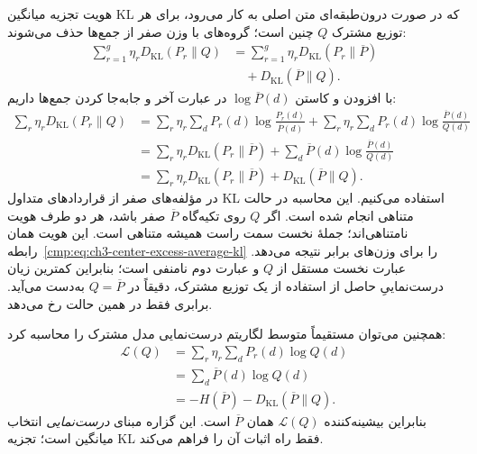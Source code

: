 هویت تجزیه میانگین KL که در صورت درون‌طبقه‌ای متن اصلی به کار می‌رود، برای هر توزیع مشترک $Q$ چنین است؛ گروه‌های با وزن صفر از جمع‌ها حذف می‌شوند:
\begin{equation}\label{eq:app-ch3-mixture-KL-general}
\boxed{
\begin{aligned}
\sum_{r=1}^{g}\eta_rD_{\mathrm{KL}}(P_r\|Q)
&=\sum_{r=1}^{g}\eta_rD_{\mathrm{KL}}(P_r\|\overline P)\\
&\quad+D_{\mathrm{KL}}(\overline P\|Q).
\end{aligned}}
\end{equation}
 با افزودن و کاستن $\log\overline P(d)$ در عبارت آخر و جابه‌جا کردن جمع‌ها داریم:
\begin{equation}\label{eq:app-ch3-mixture-KL-decomposition-proof}
\begin{aligned}
\sum_r\eta_rD_{\mathrm{KL}}(P_r\|Q)
&=\sum_r\eta_r\sum_dP_r(d)
\log\frac{P_r(d)}{\overline P(d)}
+\sum_r\eta_r\sum_dP_r(d)
\log\frac{\overline P(d)}{Q(d)}\\
&=\sum_r\eta_rD_{\mathrm{KL}}(P_r\|\overline P)
+\sum_d\overline P(d)\log\frac{\overline P(d)}{Q(d)}\\
&=\sum_r\eta_rD_{\mathrm{KL}}(P_r\|\overline P)
+D_{\mathrm{KL}}(\overline P\|Q).
\end{aligned}
\end{equation}
در مؤلفه‌های صفر از قراردادهای متداول KL استفاده می‌کنیم. این محاسبه در حالت متناهی انجام شده است. اگر $Q$ روی تکیه‌گاه $\overline P$ صفر باشد، هر دو طرف هویت نامتناهی‌اند؛ جملهٔ نخست سمت راست همیشه متناهی است. این هویت همان رابطه~\eqref{cmp:eq:ch3-center-excess-average-kl} را برای وزن‌های برابر نتیجه می‌دهد. عبارت نخست مستقل از $Q$ و عبارت دوم نامنفی است؛ بنابراین کمترین زیان درست‌نماییِ حاصل از استفاده از یک توزیع مشترک، دقیقاً در $Q=\overline P$ به‌دست می‌آید. برابری فقط در همین حالت رخ می‌دهد.

همچنین می‌توان مستقیماً متوسط لگاریتم درست‌نمایی مدل مشترک را محاسبه کرد:
\begin{equation}\label{eq:app-ch3-mixture-MLE-proof}
\begin{aligned}
\mathcal L(Q)
&=\sum_r\eta_r\sum_dP_r(d)\log Q(d)\\
&=\sum_d\overline P(d)\log Q(d)\\
&=-H(\overline P)-D_{\mathrm{KL}}(\overline P\|Q).
\end{aligned}
\end{equation}
بنابراین بیشینه‌کننده $\mathcal L(Q)$ همان $\overline P$ است. این گزاره مبنای \emph{درست‌نمایی} انتخاب میانگین است؛ تجزیه KL فقط راه اثبات آن را فراهم می‌کند.

